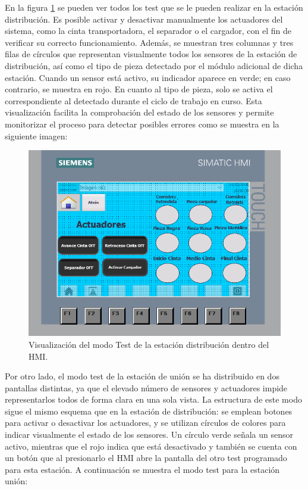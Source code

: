 En la figura \ref{fig:HMI_test_distribucion} se pueden ver todos los test que se le pueden realizar en la estación distribución. Es posible activar y desactivar manualmente los actuadores del sistema, como la cinta transportadora, el separador o el cargador, con el fin de verificar su correcto funcionamiento. Además, se muestran tres columnas y tres filas de círculos que representan visualmente todos los sensores de la estación de distribución, así como el tipo de pieza detectado por el módulo adicional de dicha estación. Cuando un sensor está activo, su indicador aparece en verde; en caso contrario, se muestra en rojo. En cuanto al tipo de pieza, solo se activa el correspondiente al detectado durante el ciclo de trabajo en curso. Esta visualización facilita la comprobación del estado de los sensores y permite monitorizar el proceso para detectar posibles errores como se muestra en la siguiente imagen: 

\begin{figure}[h!]
  \begin{center}
  	\includegraphics[width=12cm]{figs/HMI_test_distribucion}
  \end{center}
  \caption{\centering Visualización del modo Test de la estación distribución dentro del HMI.}
  \label{fig:HMI_test_distribucion}
\end{figure}

Por otro lado, el modo test de la estación de unión se ha distribuido en dos pantallas distintas, ya que el elevado número de sensores y actuadores impide representarlos todos de forma clara en una sola vista. La estructura de este modo sigue el mismo esquema que en la estación de distribución: se emplean botones para activar o desactivar los actuadores, y se utilizan círculos de colores para indicar visualmente el estado de los sensores. Un círculo verde señala un sensor activo, mientras que el rojo indica que está desactivado y también se cuenta con un botón que al presionarlo el HMI abre la pantalla del otro test programado para esta estación. A continuación se muestra el modo test para la estación unión:

